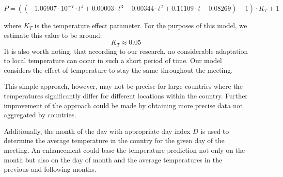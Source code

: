 $$P=\left( (-1.06907 \cdot 10^{-7} \cdot t^{4}+0.00003 \cdot t^{3}-0.00344 \cdot t^{2}+0.11109 \cdot t-0.08269)-1 \right)\cdot K_{T}+1$$

\noindent where $K_{T}$ is the temperature effect parameter. For the purposes of this model, we estimate this value to be around:
$$K_{T}\approx 0.05$$
It is also worth noting, that according to our research, no considerable adaptation to local temperature can occur in such a short period of time. Our model considers the effect of temperature to stay the same throughout the meeting.

This simple approach, however, may not be precise for large countries where the temperatures significantly differ for different locations within the country. Further improvement of the approach could be made by obtaining more precise data not aggregated by countries.

Additionally, the month of the day with appropriate day index $D$ is used to determine the average temperature in the country for the given day of the meeting. An enhancement could base the temperature prediction not only on the month but also on the day of month and the average temperatures in the previous and following months.
